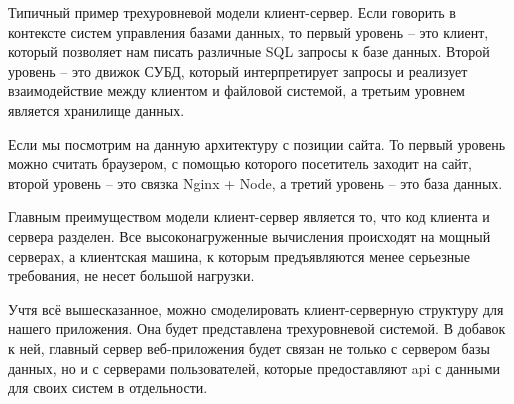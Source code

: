 Типичный пример трехуровневой модели клиент-сервер. Если говорить в контексте систем управления базами данных, то первый уровень – это клиент, который позволяет нам писать различные SQL запросы к базе данных. Второй уровень – это движок СУБД, который интерпретирует запросы и реализует взаимодействие между клиентом и файловой системой, а третьим уровнем является хранилище данных.

Если мы посмотрим на данную архитектуру с позиции сайта. То первый уровень можно считать браузером, с помощью которого посетитель заходит на сайт, второй уровень – это связка Nginx + Node, а третий уровень – это база данных. 

Главным преимуществом модели клиент-сервер является то, что код клиента и сервера разделен. Все высоконагруженные вычисления происходят на мощный серверах, а клиентская машина, к которым предъявляются менее серьезные требования, не несет большой нагрузки.

Учтя всё вышесказанное, можно смоделировать клиент-серверную структуру для нашего приложения. Она будет представлена трехуровневой системой. В добавок к ней, главный сервер веб-приложения будет связан не только с сервером базы данных, но и с серверами пользователей, которые предоставляют api с данными для своих систем в отдельности. 
